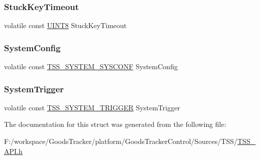 \subsubsection{\texorpdfstring{Stuck\+Key\+Timeout}{StuckKeyTimeout}}
{\footnotesize\ttfamily volatile const \hyperlink{_t_s_s___data_types_8h_ab27e9918b538ce9d8ca692479b375b6a}{U\+I\+N\+T8} Stuck\+Key\+Timeout}

\mbox{\label{struct_t_s_s___c_s_system_a9e44eb4e9e8fc3831e2562fb5e3abf9d}} 
\subsubsection{\texorpdfstring{System\+Config}{SystemConfig}}
{\footnotesize\ttfamily volatile const \hyperlink{struct_t_s_s___s_y_s_t_e_m___s_y_s_c_o_n_f}{T\+S\+S\+\_\+\+S\+Y\+S\+T\+E\+M\+\_\+\+S\+Y\+S\+C\+O\+NF} System\+Config}

\mbox{\label{struct_t_s_s___c_s_system_a122ae9f08e49d72b2bd833cc8e502239}} 
\subsubsection{\texorpdfstring{System\+Trigger}{SystemTrigger}}
{\footnotesize\ttfamily volatile const \hyperlink{struct_t_s_s___s_y_s_t_e_m___t_r_i_g_g_e_r}{T\+S\+S\+\_\+\+S\+Y\+S\+T\+E\+M\+\_\+\+T\+R\+I\+G\+G\+ER} System\+Trigger}



The documentation for this struct was generated from the following file\+:\begin{DoxyCompactItemize}
\item 
F\+:/workspace/\+Goods\+Tracker/platform/\+Goods\+Tracker\+Control/\+Sources/\+T\+S\+S/\hyperlink{_t_s_s___a_p_i_8h}{T\+S\+S\+\_\+\+A\+P\+I.\+h}\end{DoxyCompactItemize}
